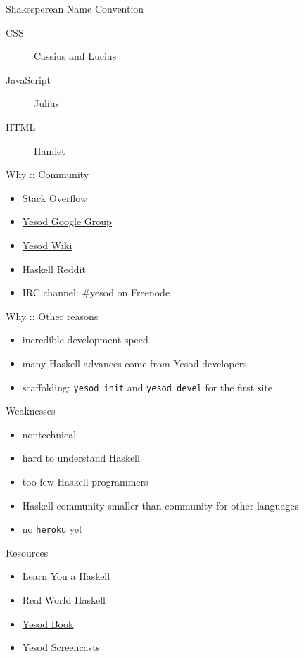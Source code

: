\documentclass{beamer}
\begin{document}
\begin{frame}{Shakesperean Name Convention}
  \begin{description}
    \item[CSS] Cassius and Lucius
    \item[JavaScript] Julius
    \item[HTML] Hamlet
  \end{description}
  
\end{frame}

\begin{frame}{Why :: Community}
  \begin{itemize}
    \item \href{http://stackoverflow.com/questions/tagged/yesod}{Stack Overflow}
    \item \href{http://groups.google.com/group/yesodweb}{Yesod Google Group}
    \item \href{http://www.yesodweb.com/wiki}{Yesod Wiki}
    \item \href{http://www.reddit.com/r/haskell/}{Haskell Reddit}
    \item IRC channel: \#yesod on Freenode
  \end{itemize}
\end{frame}

\begin{frame}{Why :: Other reasons}
  \begin{itemize}
    \item incredible development speed
    \item many Haskell advances come from Yesod developers
    \item scaffolding: \texttt{yesod init} and \texttt{yesod devel} for the
    first site
  \end{itemize}
\end{frame}

\begin{frame}{Weaknesses}
  \begin{itemize}
    \item nontechnical
    \pause
    \item hard to understand Haskell
    \item too few Haskell programmers
    \item Haskell community smaller than community for other languages
    \item no \texttt{heroku} yet
  \end{itemize}
\end{frame}

\begin{frame}{Resources}
  \begin{itemize}
    \item \href{http://learnyouahaskell.com/}{Learn You a Haskell}
    \item \href{http://book.realworldhaskell.org/read/}{Real World Haskell}
    \item \href{http://www.yesodweb.com/book}{Yesod Book}
    \item \href{http://www.yesodweb.com/page/screencasts}{Yesod Screencasts}
  \end{itemize}
\end{frame}
\end{document}
